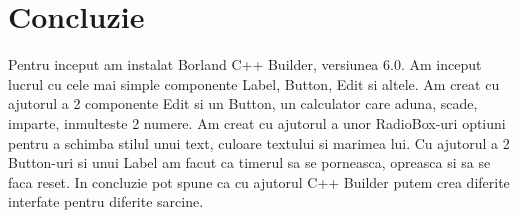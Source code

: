 \section*{Concluzie}

Pentru inceput am instalat Borland C++ Builder, versiunea 6.0. Am inceput lucrul cu cele mai simple componente Label, Button, Edit si altele. Am creat cu ajutorul a 2 componente Edit si un Button, un calculator care aduna, scade, imparte, inmulteste 2 numere. Am creat cu ajutorul a unor RadioBox-uri optiuni pentru a schimba stilul unui text, culoare textului si marimea lui. Cu ajutorul a 2 Button-uri si unui Label am facut ca timerul sa se porneasca, opreasca si sa se faca reset. In concluzie pot spune ca cu ajutorul C++ Builder putem crea diferite interfate pentru diferite sarcine.

\clearpage